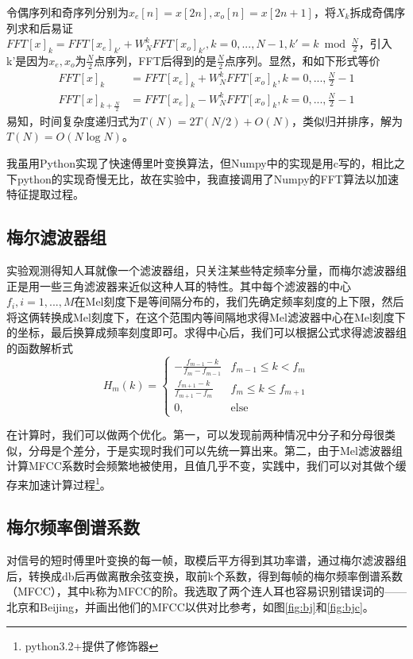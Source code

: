 \documentclass[12pt]{article} %
\begin{document}
令偶序列和奇序列分别为$x_e[n] = x[2n], x_o[n] = x[2n+1]$，将$X_k$拆成奇偶序列求和后易证 $FFT[x]_k = FFT[x_e]_{k'} + W_N^k FFT[x_o]_{k'}, k = 0, ..., N-1, k' = k \bmod \frac{N}{2}$，引入k'是因为$x_e,x_o$为$\frac{N}{2}$点序列，FFT后得到的是$\frac{N}{2}$点序列。显然，和如下形式等价
$$
\begin{aligned}
FFT[x]_k &= FFT[x_e]_{k} + W_N^k FFT[x_o]_{k}, k = 0, ..., \frac{N}{2}-1 \\
FFT[x]_{k + \frac{N}{2}} &= FFT[x_e]_{k} - W_N^k FFT[x_o]_{k}, k = 0, ..., \frac{N}{2}-1 
\end{aligned}
$$
易知，时间复杂度递归式为$T(N) = 2T(N/2) + O(N)$，类似归并排序，解为$T(N) = O(N\log N)$。

我虽用Python实现了快速傅里叶变换算法，但Numpy中的实现是用c写的，相比之下python的实现奇慢无比，故在实验中，我直接调用了Numpy的FFT算法以加速特征提取过程。

\subsection{梅尔滤波器组}
实验观测得知人耳就像一个滤波器组，只关注某些特定频率分量，而梅尔滤波器组正是用一些三角滤波器来近似这种人耳的特性。其中每个滤波器的中心$f_i, i = 1, ..., M$在Mel刻度下是等间隔分布的，我们先确定频率刻度的上下限，然后将这俩转换成Mel刻度下，在这个范围内等间隔地求得Mel滤波器中心在Mel刻度下的坐标，最后换算成频率刻度即可。求得中心后，我们可以根据公式求得滤波器组的函数解析式
$$
H_m(k) = \begin{cases}
- \frac{f_{m-1} - k}{f_m - f_{m-1}} & f_{m-1} \le k< f_m\\
\frac{f_{m+1} - k}{f_{m+1} - f_{m}} & f_m 
\le k \le f_{m+1}\\
0, &\text{else}
\end{cases}
$$

在计算时，我们可以做两个优化。第一，可以发现前两种情况中分子和分母很类似，分母是个差分，于是实现时我们可以先统一算出来。第二，由于Mel滤波器组计算MFCC系数时会频繁地被使用，且值几乎不变，实践中，我们可以对其做个缓存来加速计算过程\footnote{python3.2+提供了修饰器}。


\subsection{梅尔频率倒谱系数}
对信号的短时傅里叶变换的每一帧，取模后平方得到其功率谱，通过梅尔滤波器组后，转换成db后再做离散余弦变换，取前k个系数，得到每帧的梅尔频率倒谱系数（MFCC），其中k称为MFCC的阶。我选取了两个连人耳也容易识别错误词的——北京和Beijing，并画出他们的MFCC以供对比参考，如图\ref{fig:bj}和\ref{fig:bjc}。
\end{document}
